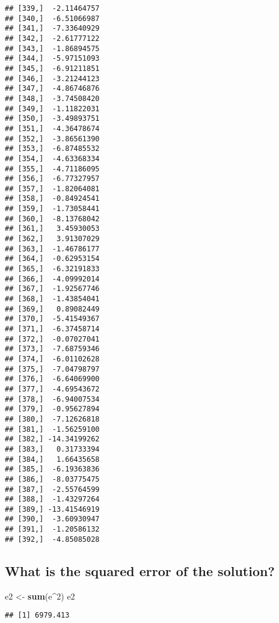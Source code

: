 \documentclass[]{article}
\newenvironment{Shaded}{\begin{snugshade}}{\end{snugshade}}
\newcommand{\KeywordTok}[1]{\textcolor[rgb]{0.13,0.29,0.53}{\textbf{{#1}}}}
\newcommand{\DecValTok}[1]{\textcolor[rgb]{0.00,0.00,0.81}{{#1}}}
\newcommand{\StringTok}[1]{\textcolor[rgb]{0.31,0.60,0.02}{{#1}}}
\newcommand{\NormalTok}[1]{{#1}}
\begin{document}
\begin{verbatim}
## [339,]  -2.11464757
## [340,]  -6.51066987
## [341,]  -7.33640929
## [342,]  -2.61777122
## [343,]  -1.86894575
## [344,]  -5.97151093
## [345,]  -6.91211851
## [346,]  -3.21244123
## [347,]  -4.86746876
## [348,]  -3.74508420
## [349,]  -1.11822031
## [350,]  -3.49893751
## [351,]  -4.36478674
## [352,]  -3.86561390
## [353,]  -6.87485532
## [354,]  -4.63368334
## [355,]  -4.71186095
## [356,]  -6.77327957
## [357,]  -1.82064081
## [358,]  -0.84924541
## [359,]  -1.73058441
## [360,]  -8.13768042
## [361,]   3.45930053
## [362,]   3.91307029
## [363,]  -1.46786177
## [364,]  -0.62953154
## [365,]  -6.32191833
## [366,]  -4.09992014
## [367,]  -1.92567746
## [368,]  -1.43854041
## [369,]   0.89082449
## [370,]  -5.41549367
## [371,]  -6.37458714
## [372,]  -0.07027041
## [373,]  -7.68759346
## [374,]  -6.01102628
## [375,]  -7.04798797
## [376,]  -6.64069900
## [377,]  -4.69543672
## [378,]  -6.94007534
## [379,]  -0.95627894
## [380,]  -7.12626818
## [381,]  -1.56259100
## [382,] -14.34199262
## [383,]   0.31733394
## [384,]   1.66435658
## [385,]  -6.19363836
## [386,]  -8.03775475
## [387,]  -2.55764599
## [388,]  -1.43297264
## [389,] -13.41546919
## [390,]  -3.60930947
## [391,]  -1.20586132
## [392,]  -4.85085028
\end{verbatim}

\subsection{What is the squared error of the
solution?}\label{what-is-the-squared-error-of-the-solution}

\begin{Shaded}
\begin{Highlighting}[]
\NormalTok{e2 <-}\StringTok{ }\KeywordTok{sum}\NormalTok{(e^}\DecValTok{2}\NormalTok{)}
\NormalTok{e2}
\end{Highlighting}
\end{Shaded}

\begin{verbatim}
## [1] 6979.413
\end{verbatim}
\end{document}
